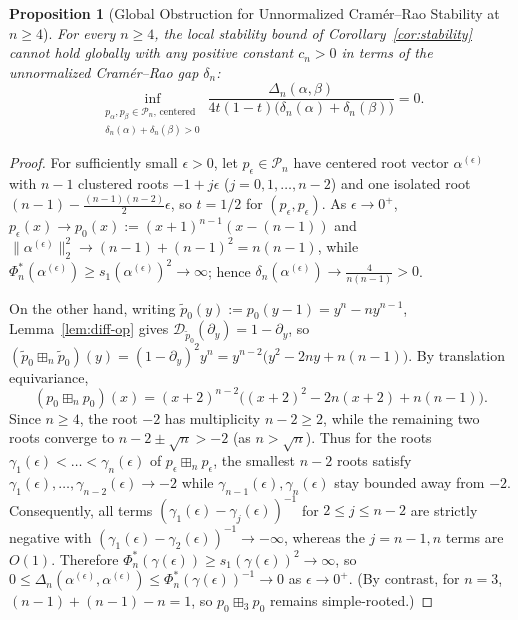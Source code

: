 \documentclass[11pt,a4paper]{article}
\newtheorem{proposition}[theorem]{Proposition}
\theoremstyle{definition}
\newcommand{\boxplusn}{\boxplus_n}
\begin{document}
\begin{proposition}[Global Obstruction for Unnormalized Cram\'er--Rao Stability at $n \ge 4$]
\label{prop:global-obstruction}
For every $n \ge 4$, the local stability bound of Corollary~\ref{cor:stability} cannot hold globally with any positive constant $c_n > 0$ in terms of the unnormalized Cram\'er--Rao gap $\delta_n$:
\[
\inf_{\substack{p_\alpha, p_\beta \in \mathcal{P}_n,\, \text{centered} \\ \delta_n(\alpha) + \delta_n(\beta) > 0}} \frac{\Delta_n(\alpha, \beta)}{4t(1-t)\big(\delta_n(\alpha) + \delta_n(\beta)\big)} = 0.
\]
\end{proposition}

\begin{proof}
For sufficiently small $\epsilon > 0$, let $p_\epsilon \in \mathcal{P}_n$ have centered root vector $\alpha^{(\epsilon)}$ with $n-1$ clustered roots $-1 + j\epsilon$ ($j=0,1,\dots,n-2$) and one isolated root $(n-1) - \frac{(n-1)(n-2)}{2}\epsilon$, so $t = 1/2$ for $(p_\epsilon, p_\epsilon)$. As $\epsilon \to 0^+$, $p_\epsilon(x) \to p_0(x) := (x+1)^{n-1}(x - (n-1))$ and $\|\alpha^{(\epsilon)}\|_2^2 \to (n-1) + (n-1)^2 = n(n-1)$, while $\Phi_n^*(\alpha^{(\epsilon)}) \ge s_1(\alpha^{(\epsilon)})^2 \to \infty$; hence $\delta_n(\alpha^{(\epsilon)}) \to \frac{4}{n(n-1)} > 0$.

On the other hand, writing $\tilde{p}_0(y) := p_0(y - 1) = y^n - n y^{n-1}$, Lemma~\ref{lem:diff-op} gives $\mathcal{D}_{\tilde{p}_0}(\partial_y) = 1 - \partial_y$, so $(\tilde{p}_0 \boxplusn \tilde{p}_0)(y) = (1 - \partial_y)^2 y^n = y^{n-2}\big(y^2 - 2n y + n(n-1)\big)$. By translation equivariance,
\[
(p_0 \boxplusn p_0)(x) = (x+2)^{n-2}\big((x+2)^2 - 2n(x+2) + n(n-1)\big).
\]
Since $n \ge 4$, the root $-2$ has multiplicity $n-2 \ge 2$, while the remaining two roots converge to $n - 2 \pm \sqrt{n} > -2$ (as $n > \sqrt{n}$). Thus for the roots $\gamma_1(\epsilon) < \dots < \gamma_n(\epsilon)$ of $p_\epsilon \boxplusn p_\epsilon$, the smallest $n-2$ roots satisfy $\gamma_1(\epsilon), \dots, \gamma_{n-2}(\epsilon) \to -2$ while $\gamma_{n-1}(\epsilon), \gamma_n(\epsilon)$ stay bounded away from $-2$. Consequently, all terms $(\gamma_1(\epsilon) - \gamma_j(\epsilon))^{-1}$ for $2 \le j \le n-2$ are strictly negative with $(\gamma_1(\epsilon) - \gamma_2(\epsilon))^{-1} \to -\infty$, whereas the $j=n-1,n$ terms are $O(1)$. Therefore $\Phi_n^*(\gamma(\epsilon)) \ge s_1(\gamma(\epsilon))^2 \to \infty$, so $0 \le \Delta_n(\alpha^{(\epsilon)}, \alpha^{(\epsilon)}) \le \Phi_n^*(\gamma(\epsilon))^{-1} \to 0$ as $\epsilon \to 0^+$. (By contrast, for $n=3$, $(n-1)+(n-1)-n = 1$, so $p_0 \boxplus_3 p_0$ remains simple-rooted.)
\end{proof}
\end{document}
